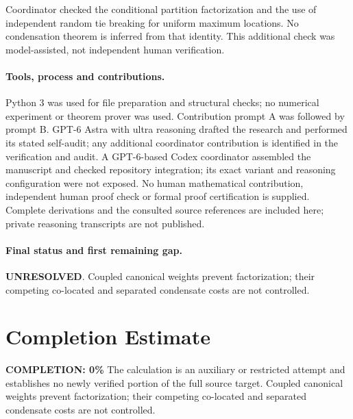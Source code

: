 \documentclass[11pt]{article}
\begin{document}
Coordinator checked the conditional partition factorization and the use of independent random tie breaking for uniform maximum locations. No condensation theorem is inferred from that identity. This additional check was model-assisted, not independent human verification.

\paragraph{Tools, process and contributions.}
Python 3 was used for file preparation and structural checks; no numerical experiment or theorem prover was used. Contribution prompt A was followed by prompt B. GPT-6 Astra with ultra reasoning drafted the research and performed its stated self-audit; any additional coordinator contribution is identified in the verification and audit. A GPT-6-based Codex coordinator assembled the manuscript and checked repository integration; its exact variant and reasoning configuration were not exposed. No human mathematical contribution, independent human proof check or formal proof certification is supplied. Complete derivations and the consulted source references are included here; private reasoning transcripts are not published.

\paragraph{Final status and first remaining gap.}
\textbf{UNRESOLVED}. Coupled canonical weights prevent factorization; their competing co-located and separated condensate costs are not controlled.

\section{Completion Estimate}
\noindent\textbf{COMPLETION: 0\%}
The calculation is an auxiliary or restricted attempt and establishes no newly verified portion of the full source target. Coupled canonical weights prevent factorization; their competing co-located and separated condensate costs are not controlled.
\end{document}
